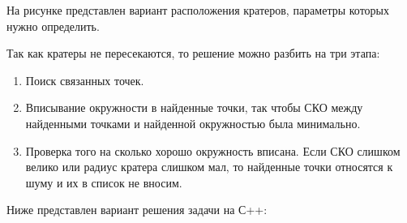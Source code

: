 \solutionSection

На рисунке представлен вариант расположения кратеров, параметры которых нужно определить.


Так как кратеры не пересекаются, то решение можно разбить на три этапа:
\begin{enumerate}
    \item Поиск связанных точек.
    \item Вписывание окружности в найденные точки, так чтобы СКО между найденными точками и найденной окружностью была минимально.
    \item Проверка того на сколько хорошо окружность вписана. Если СКО слишком велико или радиус кратера слишком мал, то найденные точки относятся к шуму и их в список не вносим.    
\end{enumerate}

Ниже представлен вариант решения задачи на С++:

\inputminted[fontsize=\footnotesize, linenos]{cpp}{final/command_tour/telecom/task_03/source.cpp}